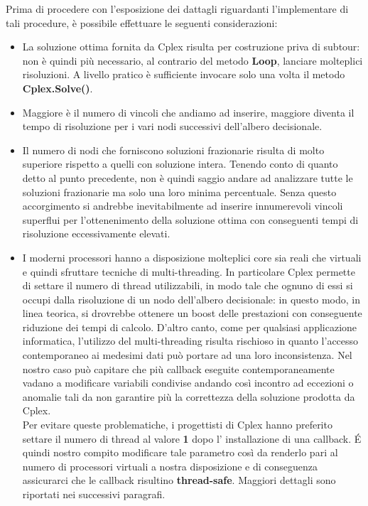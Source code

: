\documentclass[11pt]{article}
\begin{document}
Prima di procedere con l'esposizione dei dattagli riguardanti l'implementare di tali procedure, è possibile effettuare le seguenti considerazioni:\\

\begin{itemize}
    \item La soluzione ottima fornita da Cplex risulta per costruzione priva di subtour: non è quindi più necessario, al contrario del metodo \textbf{Loop}, lanciare molteplici risoluzioni. A livello pratico è sufficiente invocare solo una volta il metodo \textbf{Cplex.Solve()}.
    \item Maggiore è il numero di vincoli che andiamo ad inserire, maggiore diventa il tempo di risoluzione per i vari nodi successivi dell'albero decisionale.
    \item Il numero di nodi che forniscono soluzioni frazionarie risulta di molto superiore rispetto a quelli con soluzione intera. Tenendo conto di quanto detto al punto precedente, non è quindi saggio andare ad analizzare tutte le soluzioni frazionarie ma solo una loro minima percentuale. Senza questo accorgimento si andrebbe inevitabilmente ad inserire innumerevoli vincoli superflui per l'ottenenimento della soluzione ottima con conseguenti tempi di risoluzione eccessivamente elevati.
    \item I moderni processori hanno a disposizione molteplici core sia reali che virtuali e quindi sfruttare tecniche di multi-threading. In particolare Cplex permette di settare il numero di thread utilizzabili, in modo tale che ognuno di essi si occupi dalla risoluzione di un nodo dell'albero decisionale: in questo modo, in linea teorica, si drovrebbe ottenere un boost delle prestazioni con conseguente riduzione dei tempi di calcolo. D'altro canto, come per qualsiasi applicazione informatica, l'utilizzo del multi-threading risulta rischioso in quanto l'accesso contemporaneo ai medesimi dati può portare ad una loro inconsistenza. Nel nostro caso può capitare che più callback eseguite contemporaneamente vadano a modificare variabili condivise andando così incontro ad eccezioni o anomalie tali da non garantire più la correttezza della soluzione prodotta da Cplex.\\
    Per evitare queste problematiche, i progettisti di Cplex hanno preferito settare il numero di thread al valore \textbf{1} dopo l' installazione di una callback. \'E quindi nostro compito modificare tale parametro così da renderlo pari al numero di processori virtuali a nostra disposizione e di conseguenza assicurarci che le callback risultino \textbf{thread-safe}. Maggiori dettagli sono riportati nei successivi paragrafi.
\end{itemize}
\end{document}
